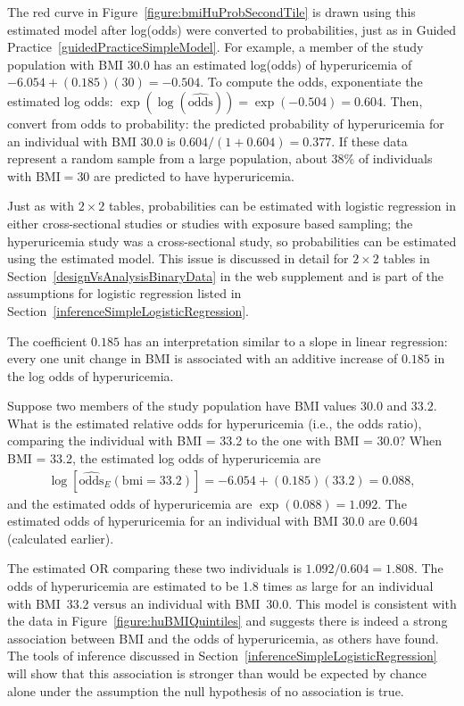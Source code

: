 The red curve in Figure~\ref{figure:bmiHuProbSecondTile} is drawn using this estimated model after log(odds) were converted to probabilities, just as in Guided Practice~\ref{guidedPracticeSimpleModel}. For example, a member of the study population with BMI 30.0 has an estimated log(odds) of hyperuricemia of $-6.054 + (0.185)(30) = -0.504$. To compute the odds, exponentiate the estimated log odds: $\exp(\log(\widehat{\text{odds}})) = \exp(-0.504) = 0.604$. Then, convert from odds to probability: the predicted probability of hyperuricemia for an individual with BMI 30.0 is $0.604/(1 + 0.604) = 0.377$. If these data represent a random sample from a large population, about 38\% of individuals with $\text{BMI} = 30$ are predicted to have hyperuricemia.

Just as with $2 \times 2$ tables, probabilities can be estimated with logistic regression in either cross-sectional studies or studies with exposure based sampling; the hyperuricemia study was a cross-sectional study, so probabilities can be estimated using the estimated model. This issue is discussed in detail for $2 \times 2$ tables in Section~\ref{designVsAnalysisBinaryData} in the web supplement and is part of the assumptions for logistic regression listed in Section~\ref{inferenceSimpleLogisticRegression}.

The coefficient $0.185$ has an interpretation similar to a slope in linear regression: every one unit change in BMI is associated with an additive increase of $0.185$ in the log odds of hyperuricemia.

\begin{examplewrap}
\begin{nexample}{Suppose two members of the study population have BMI values $30.0$ and $33.2$. What is the estimated relative odds for hyperuricemia (i.e., the odds ratio), comparing the individual with BMI = 33.2 to the one with BMI = 30.0?}\label{example:ORHyperuricemia33v30}
When BMI = 33.2, the estimated log odds of hyperuricemia are
\begin{align*}
  \log[\widehat{\text{odds}}_E(\text{bmi} = 33.2)] = -6.054 + (0.185)(33.2) = 0.088,
\end{align*}
and the estimated odds of hyperuricemia are $\exp(0.088) = 1.092$. The estimated odds of hyperuricemia for an individual with BMI $30.0$ are $0.604$ (calculated earlier).

The estimated OR comparing these two individuals is $1.092/0.604 = 1.808$.  The odds of hyperuricemia are estimated to be 1.8 times as large for an individual with BMI~33.2 versus an individual with BMI~30.0.  This model is consistent with the data in Figure~\ref{figure:huBMIQuintiles} and suggests there is indeed a strong association between BMI and the odds of hyperuricemia, as others have found.  The tools of inference discussed in Section~\ref{inferenceSimpleLogisticRegression} will show that this association is stronger than would be expected by chance alone under the assumption the null hypothesis of no association is true.
  \end{nexample}
\end{examplewrap}

